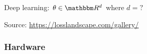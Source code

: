 \documentclass[
    xcolor={svgnames,dvipsnames},
    hyperref={colorlinks, citecolor=DeepPink4, linkcolor=DarkRed, urlcolor=DarkBlue}
    ]{beamer}  %
\newcommand{\1}{\mathbbm 1}
\newcommand{\RR}{\mathbbm R}
\begin{document}
\begin{frame}

    Deep learning: $\theta \in \RR^d$ where $d = ?$
    
    \begin{figure}
       \begin{center}
       \end{center}
    \end{figure}

    Source: \url{https://losslandscape.com/gallery/}

\end{frame}

\begin{frame}
    \frametitle{Hardware}
    
    \begin{figure}
       \begin{center}
       \end{center}
    \end{figure}


\end{frame}
\end{document}
